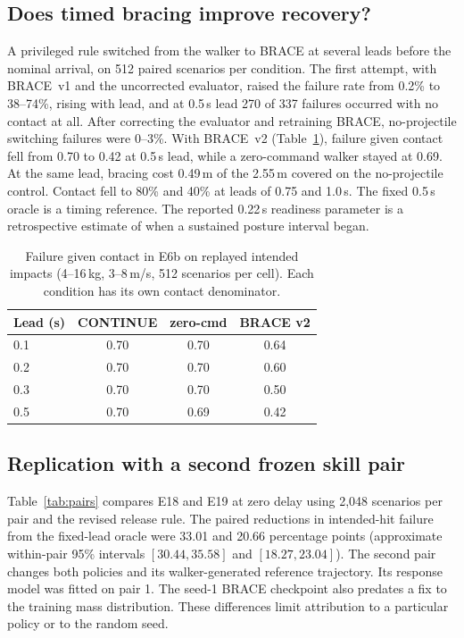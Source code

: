 \documentclass[10pt,twocolumn]{article}
\begin{document}
\subsection{Does timed bracing improve recovery?}\label{sec:gate}
A privileged rule switched from the walker to BRACE at several leads before the nominal arrival, on 512 paired scenarios per condition. The first attempt, with BRACE~v1 and the uncorrected evaluator, raised the failure rate from 0.2\% to 38--74\%, rising with lead, and at 0.5\,s lead 270 of 337 failures occurred with no contact at all. After correcting the evaluator and retraining BRACE, no-projectile switching failures were 0--3\%. With BRACE~v2 (Table~\ref{tab:gate}), failure given contact fell from 0.70 to 0.42 at 0.5\,s lead, while a zero-command walker stayed at 0.69. At the same lead, bracing cost 0.49\,m of the 2.55\,m covered on the no-projectile control. Contact fell to 80\% and 40\% at leads of 0.75 and 1.0\,s. The fixed 0.5\,s oracle is a timing reference. The reported 0.22\,s readiness parameter is a retrospective estimate of when a sustained posture interval began.

\begin{table}[t]\centering\small
\caption{Failure given contact in E6b on replayed intended impacts (4--16\,kg, 3--8\,m/s, 512 scenarios per cell). Each condition has its own contact denominator.}\label{tab:gate}
\begin{tabular}{lccc}\toprule
Lead (s) & CONTINUE & zero-cmd & BRACE v2 \\\midrule
0.1 & 0.70 & 0.70 & 0.64 \\
0.2 & 0.70 & 0.70 & 0.60 \\
0.3 & 0.70 & 0.70 & 0.50 \\
0.5 & 0.70 & 0.69 & 0.42 \\\bottomrule
\end{tabular}
\end{table}

\subsection{Replication with a second frozen skill pair}
Table~\ref{tab:pairs} compares E18 and E19 at zero delay using 2,048 scenarios per pair and the revised release rule. The paired reductions in intended-hit failure from the fixed-lead oracle were 33.01 and 20.66 percentage points (approximate within-pair 95\% intervals $[30.44,35.58]$ and $[18.27,23.04]$). The second pair changes both policies and its walker-generated reference trajectory. Its response model was fitted on pair 1. The seed-1 BRACE checkpoint also predates a fix to the training mass distribution. These differences limit attribution to a particular policy or to the random seed.
\end{document}
